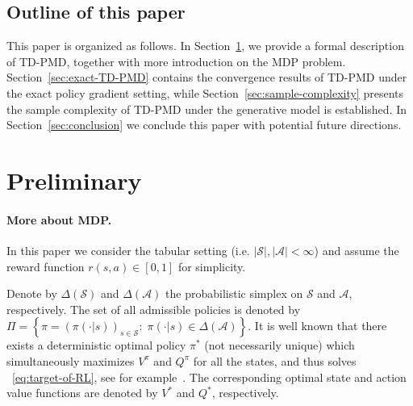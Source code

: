 \documentclass[10pt]{article}
\newcommand{\calA}{\mathcal{A}}
\newcommand{\calS}{\mathcal{S}}
\newcommand{\ls}{\left}
\newcommand{\rs}{\right}
\theoremstyle{plain}
\theoremstyle{definition}
\begin{document}
\subsection{Outline of this paper}
{This paper is organized as follows. In Section~\ref{sec:preliminary}, we provide a formal description of TD-PMD, together with more introduction on the MDP problem. Section~\ref{sec:exact-TD-PMD} contains the convergence results of TD-PMD under the exact policy gradient setting, while Section~\ref{sec:sample-complexity} presents the sample complexity of TD-PMD under the generative model is established. In Section~\ref{sec:conclusion} we conclude this paper with potential future directions.
}


\section{Preliminary}
\label{sec:preliminary}

\paragraph{More about MDP.} In this paper we consider the tabular setting (i.e. $|\calS|, |\calA| < \infty$) and assume the reward function $r(s,a) \in [0,1]$ for simplicity.

Denote by $\Delta(\calS)$ and $\Delta(\calA)$ the probabilistic simplex on $\calS$ and $\calA$, respectively.  The set of all admissible policies is denoted by $\Pi = \ls\{ \pi=(\pi(\cdot|s))_{s\in\calS}: \; \pi(\cdot|s)\in\Delta(\calA)\rs\}$. It is well known that there exists a deterministic optimal policy $\pi^*$ (not necessarily unique) which simultaneously maximizes $V^\pi$ and $Q^\pi$ for all the states, and thus solves ~\eqref{eq:target-of-RL}, see for example~\cite{VI-PI}. The corresponding optimal state and action value functions are denoted by $V^*$ and $Q^*$, respectively.
\end{document}
